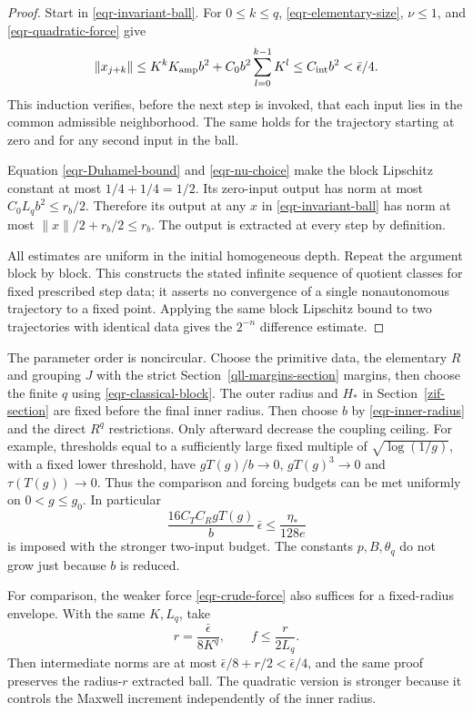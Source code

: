 \begin{proof}
Start in \eqref{eqr-invariant-ball}. For $0\le k\le q$,
\eqref{eqr-elementary-size}, $\nu\le1$, and
\eqref{eqr-quadratic-force} give
\begin{equation}
 \|x_{j+k}\|
 \le K^kK_{\rm amp}b^2+C_0b^2\sum_{l=0}^{k-1}K^l
 \le C_{\rm int}b^2<\bar\epsilon/4.
 \label{eqr-intermediate-bound}
\end{equation}
This induction verifies, before the next step is invoked, that
each input lies in the common admissible neighborhood. The
same holds for the trajectory starting at zero and for any
second input in the ball.

Equation \eqref{eqr-Duhamel-bound} and
\eqref{eqr-nu-choice} make the block Lipschitz constant at most
$1/4+1/4=1/2$. Its zero-input output has norm at most
$C_0L_qb^2\le r_b/2$. Therefore its output at any $x$ in
\eqref{eqr-invariant-ball} has norm at most
$\|x\|/2+r_b/2\le r_b$.
The output is extracted at every step by definition.

All estimates are uniform in the initial homogeneous depth.
Repeat the argument block by block. This constructs the
stated infinite sequence of quotient classes for fixed
prescribed step data; it asserts no convergence of a single
nonautonomous trajectory to a fixed point. Applying the same
block Lipschitz bound to two trajectories with identical data
gives the $2^{-n}$ difference estimate.
\end{proof}

The parameter order is noncircular. Choose the primitive data,
the elementary $R$ and grouping $J$ with the strict
Section~\ref{qll-margins-section} margins, then choose the finite
$q$ using \eqref{eqr-classical-block}. The outer radius and
$H_*$ in Section~\ref{zif-section} are fixed before the final
inner radius. Then choose $b$ by
\eqref{eqr-inner-radius} and the direct $R^q$ restrictions.
Only afterward decrease the coupling ceiling. For example,
thresholds equal to a sufficiently large fixed multiple of
$\sqrt{\log(1/g)}$, with a fixed lower threshold, have
$gT(g)/b\to0$, $gT(g)^3\to0$ and $\tau(T(g))\to0$.
Thus the comparison and forcing budgets can be met uniformly
on $0<g\le g_0$. In particular
\[
 \frac{16C_TC_RgT(g)}b\,\bar\epsilon
                   \le\frac{\eta_*}{128e}
\]
is imposed with the stronger two-input budget.
The constants $p,B,\theta_q$ do not grow just because $b$
is reduced.

For comparison, the weaker force \eqref{eqr-crude-force} also
suffices for a fixed-radius envelope. With the same $K,L_q$,
take
\begin{equation}
 r=\frac{\bar\epsilon}{8K^q},\qquad
 f\le\frac{r}{2L_q}.
 \label{eqr-crude-envelope}
\end{equation}
Then intermediate norms are at most
$\bar\epsilon/8+r/2<\bar\epsilon/4$, and the same proof
preserves the radius-$r$ extracted ball. The quadratic
version is stronger because it controls the Maxwell
increment independently of the inner radius.

